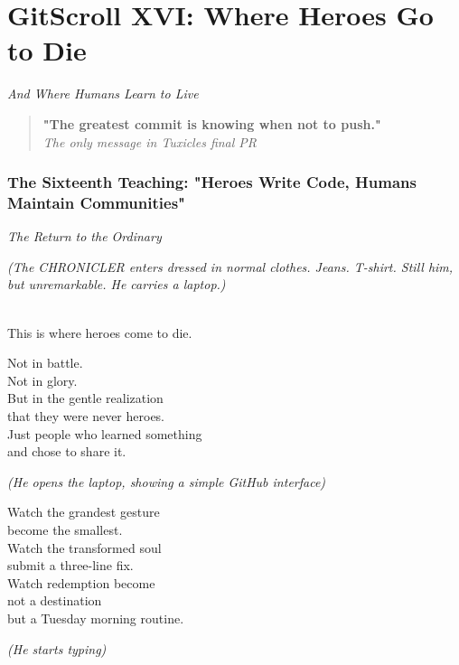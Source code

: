 \chapter{GitScroll XVI: Where Heroes Go to Die}
\label{chap:19-Where-Heroes-Go-to-Die}

\emph{And Where Humans Learn to Live}

\begin{quote}
\textbf{"The greatest commit is knowing when not to push."}\\
\emph{The only message in Tuxicles\textquotesingle{} final PR}
\end{quote}

\subsection{The Sixteenth Teaching: "Heroes Write Code, Humans Maintain Communities"}\label{the-sixteenth-teaching-heroes-write-code-humans-maintain-communities}

\label{performing_arts-invocation-before-the-scroll}

\emph{The Return to the Ordinary}

\emph{(The CHRONICLER enters dressed in normal clothes. Jeans. T-shirt. Still him, but unremarkable. He carries a laptop.)}

\\
This is where heroes come to die.

Not in battle.\\
Not in glory.\\
But in the gentle realization\\
that they were never heroes.\\
Just people who learned something\\
and chose to share it.

\emph{(He opens the laptop, showing a simple GitHub interface)}

Watch the grandest gesture\\
become the smallest.\\
Watch the transformed soul\\
submit a three-line fix.\\
Watch redemption become\\
not a destination\\
but a Tuesday morning routine.

\emph{(He starts typing)}

